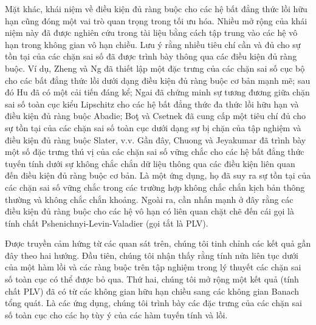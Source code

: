 Mặt khác, khái niệm về điều kiện đủ ràng buộc cho các hệ bất đẳng thức lồi hữu hạn cũng đóng một vai trò quan trọng trong tối ưu hóa. Nhiều mở rộng của khái niệm này đã được nghiên cứu trong tài liệu bằng cách tập trung vào các hệ vô hạn trong không gian vô hạn chiều. Lưu ý rằng nhiều tiêu chí cần và đủ cho sự tồn tại của các chặn sai số đã được trình bày thông qua các điều kiện đủ ràng buộc. Ví dụ, Zheng và Ng đã thiết lập một đặc trưng của các chặn sai số cục bộ cho các bất đẳng thức lồi dưới dạng điều kiện đủ ràng buộc cơ bản mạnh mẽ; sau đó Hu đã có một cải tiến đáng kể; Ngai đã chứng minh sự tương đương giữa chặn sai số toàn cục kiểu Lipschitz cho các hệ bất đẳng thức đa thức lồi hữu hạn và điều kiện đủ ràng buộc Abadie; Boţ và Csetnek đã cung cấp một tiêu chí đủ cho sự tồn tại của các chặn sai số toàn cục dưới dạng sự bị chặn của tập nghiệm và điều kiện đủ ràng buộc Slater, v.v. Gần đây, Chuong và Jeyakumar đã trình bày một số đặc trưng thú vị của các chặn sai số vững chắc cho các hệ bất đẳng thức tuyến tính dưới sự không chắc chắn dữ liệu thông qua các điều kiện liên quan đến điều kiện đủ ràng buộc cơ bản. Là một ứng dụng, họ đã suy ra sự tồn tại của các chặn sai số vững chắc trong các trường hợp không chắc chắn kịch bản thông thường và không chắc chắn khoảng. Ngoài ra, cần nhấn mạnh ở đây rằng các điều kiện đủ ràng buộc cho các hệ vô hạn có liên quan chặt chẽ đến cái gọi là tính chất Pshenichnyi-Levin-Valadier (gọi tắt là PLV).

Được truyền cảm hứng từ các quan sát trên, chúng tôi tinh chỉnh các kết quả gần đây theo hai hướng. Đầu tiên, chúng tôi nhận thấy rằng tính nửa liên tục dưới của một hàm lồi và các ràng buộc trên tập nghiệm trong lý thuyết các chặn sai số toàn cục có thể được bỏ qua. Thứ hai, chúng tôi mở rộng một kết quả (tính chất PLV) đã có từ các không gian hữu hạn chiều sang các không gian Banach tổng quát. Là các ứng dụng, chúng tôi trình bày các đặc trưng của các chặn sai số toàn cục cho các họ tùy ý của các hàm tuyến tính và lồi.
